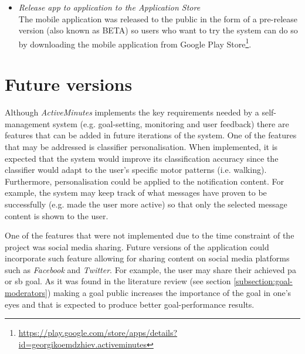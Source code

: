 \begin{itemize}
    \item \textit{Release app to application to the Application Store}\\
    The mobile application was released to the public in the form of a pre-release version (also known as BETA) so users who want to try the system can do so by downloading the mobile application from Google Play Store\footnote{\url{https://play.google.com/store/apps/details?id=georgikoemdzhiev.activeminutes}}.
    
\end{itemize}

\section{Future versions}
Although \textit{ActiveMinutes} implements the key requirements needed by a self-management system (e.g. goal-setting, monitoring and user feedback) there are features that can be added in future iterations of the system. One of the features that may be addressed is classifier personalisation. When implemented, it is expected that the system would improve its classification accuracy since the classifier would adapt to the user's specific motor patterns (i.e. walking). Furthermore, personalisation could be applied to the notification content. For example, the system may keep track of what messages have proven to be successfully (e.g. made the user more active) so that only the selected message content is shown to the user.

One of the features that were not implemented due to the time constraint of the project was social media sharing. Future versions of the application could incorporate such feature allowing for sharing content on social media platforms such as \textit{Facebook} and \textit{Twitter}. For example, the user may share their achieved \gls{pa} or \gls{sb} goal. As it was found in the literature review (see section \ref{subsection:goal-moderators}) making a goal public increases the importance of the goal in one's eyes and that is expected to produce better goal-performance results. 

